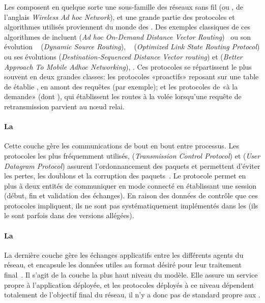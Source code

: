 Les \rcsfs composent en quelque sorte une sous-famille des réseaux sans fil \adhoc (ou \wanet, de l'anglais \textit{Wireless Ad hoc Network}), et une grande partie des protocoles et algorithmes utilisés proviennent du monde des \wanet.
Des exemples classiques de ces algorithmes de  incluent \aodv (\textit{Ad hoc On-Demand Distance Vector Routing})~\cite{aodv} ou son évolution \dsr~\cite{dsr} (\textit{Dynamic Source Routing}), \olsr~\cite{olsr} (\textit{Optimized Link State Routing Protocol}) ou ses évolutions \dsdv (\textit{Destination-Sequenced Distance Vector routing}) et \batman (\textit{Better Approach To Mobile Adhoc Networking}), \etc.
Ces protocoles se répartissent le plus souvent en deux grandes classes: les protocoles «proactifs» reposant sur une table de  établie \apriori, en amont des requêtes (\aodv par exemple); et les protocoles de  «à la demande» (dont \olsr), qui établissent les routes à la volée lorsqu'une requête de retransmission parvient au nœud relai.

            \paragraph{La }
Cette couche gère les communications de bout en bout entre processus.
Les protocoles les plus fréquemment utilisés, \tcp (\textit{Transmission Control Protocol}) et \udp (\textit{User Datagram Protocol}) assurent l'ordonnancement des paquets et permettent d'éviter les pertes, les doublons et la corruption des paquets~\cite{TW10}.
Le protocole \tcp permet en plus à deux entités de communiquer en mode connecté en établissant une session (début, fin et validation des échanges).
En raison des données de contrôle que ces protocoles impliquent, ils ne sont pas systématiquement implémentés dans les \rcs (ils le sont parfois dans des versions allégées).

            \paragraph{La }
La dernière couche gère les échanges applicatifs entre les différents agents du réseau, et encapsule les données utiles au format désiré pour leur traitement final~\cite{TW10}.
Il s'agit de la couche la plus haut niveau  du modèle.
Elle assure un service propre à l'application déployée, et les protocoles déployés à ce niveau dépendent totalement de l'objectif final du réseau, il n'y a donc pas de standard propre aux \rcs.

